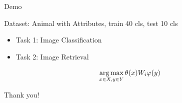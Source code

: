 \documentclass[mathserif, xcolor=table]{beamer}
\def\argmax{\mathop{\rm arg\,max}\limits}%
\begin{document}
\begin{frame}{Demo}

Dataset: Animal with Attributes, train 40 cls, test 10 cls
\begin{itemize}
	\item Task 1: Image Classification
	\item Task 2: Image Retrieval
\end{itemize}
\begin{equation*}
\argmax_{x\in X, y \in Y} \theta(x) W_i \varphi(y)
\end{equation*}
\end{frame}

\begin{frame}{}
\center
\huge
Thank you!

\end{frame}
\end{document}
